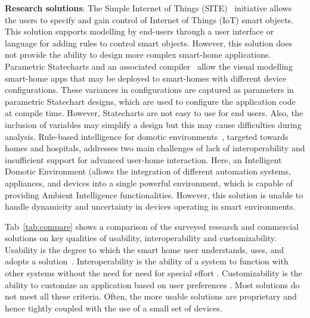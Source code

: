  
\noindent\textbf{Research solutions}: 
The Simple Internet of Things (SITE)~\cite{Hafidh} initiative allows the users to specify and gain control of Internet of Things (IoT) smart objects. This solution supports modelling by end-users through a user interface or language for adding rules to control smart objects. However, this solution does not provide the ability to design more complex smart-home applications.
Parametric Statecharts and an associated compiler~\cite{sinha2017parametric} allow the visual modelling smart-home apps that may be deployed to smart-homes with different device configurations. These variances in configurations are captured as parameters in parametric Statechart designs, which are used to configure the application code at compile time. However, Statecharts are not easy to use for end users. Also, the inclusion of variables may simplify a design but this may cause difficulties during analysis\cite{stephan2013survey}.
Rule-based intelligence for domotic environments~\cite{Bonino}, targeted towards homes and hospitals, addresses two main challenges of lack of interoperability and insufficient support for advanced user-home interaction. Here, an Intelligent Domotic Environment (allows the integration of different automation systems, appliances, and devices into a single powerful environment, which is capable of providing Ambient Intelligence functionalities. However, this solution is unable to handle dynamicity and uncertainty in devices operating in smart environments. 

Tab~\ref{tab:compare} shows a comparison of the surveyed research and commercial solutions on key qualities of usability, interoperability and customizability. Usability is the degree to which the smart home user understands, uses, and adopts a solution~\cite{demiris2008findings}. Interoperability is the ability of a system to function with other systems without the need for need for special effort \cite{miller2000interoperability}. Customizability is the ability to customize an application based on user preferences \cite{groppe2005profile}.
Most solutions do not meet all these criteria. Often, the more usable solutions are proprietary and hence tightly coupled with the use of a small set of devices. 




